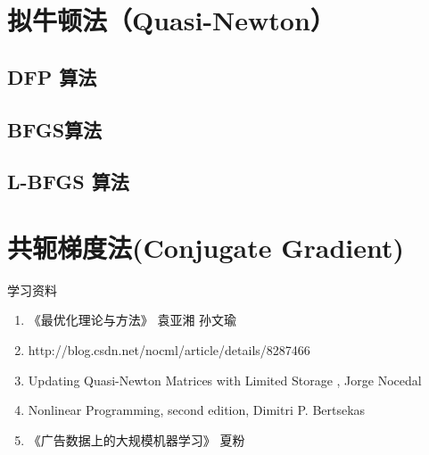 \section{拟牛顿法（Quasi-Newton）}
\subsection{DFP 算法}
\subsection{BFGS算法}
\subsection{L-BFGS 算法}


\section{共轭梯度法(Conjugate Gradient)}
学习资料
\begin{enumerate}
\item《最优化理论与方法》 袁亚湘 孙文瑜
\item http://blog.csdn.net/nocml/article/details/8287466
\item Updating Quasi-Newton Matrices with Limited Storage , Jorge Nocedal
\item Nonlinear Programming, second edition, Dimitri P. Bertsekas
\item《广告数据上的大规模机器学习》  夏粉
\end{enumerate}

\ifx\mathnotes\undefined
    
\fi
